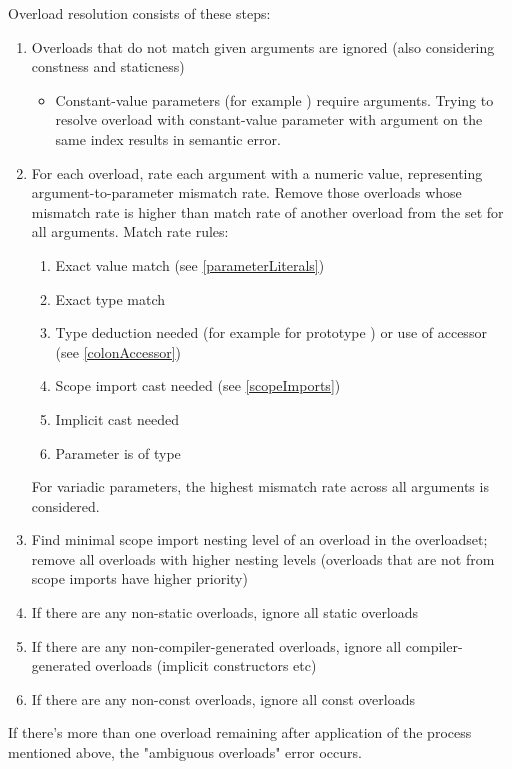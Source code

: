 Overload resolution consists of these steps:
\begin{enumerate}
	\item Overloads that do not match given arguments are ignored (also considering constness and staticness)
	\begin{itemize}
		\item Constant-value parameters (for example ) require \ctime arguments. Trying to resolve overload with constant-value parameter with \nonctime argument on the same index results in semantic error.
	\end{itemize}
	\item For each overload, rate each argument with a numeric value, representing argument-to-parameter mismatch rate. Remove those overloads whose mismatch rate is higher than match rate of another overload from the set for all arguments. Match rate rules:
		\begin{enumerate}[label=(\arabic*)]
			\item Exact value match (see \ref{parameterLiterals})
			\item Exact type match
			\item Type deduction needed (for example  for prototype ) or use of  accessor (see \ref{colonAccessor})
			\item Scope import cast needed (see \ref{scopeImports})
			\item Implicit cast needed			
			\item Parameter is of  type
		\end{enumerate}
		For variadic parameters, the highest mismatch rate across all arguments is considered.
	
	\item Find minimal scope import nesting level of an overload in the overloadset; remove all overloads with higher nesting levels (overloads that are not from scope imports have higher priority)
	\item If there are any non-static overloads, ignore all static overloads
	\item If there are any non-compiler-generated overloads, ignore all compiler-generated overloads (implicit constructors etc)
	\item If there are any non-const overloads, ignore all const overloads
\end{enumerate}

If there's more than one overload remaining after application of the process mentioned above, the "ambiguous overloads" error occurs.


